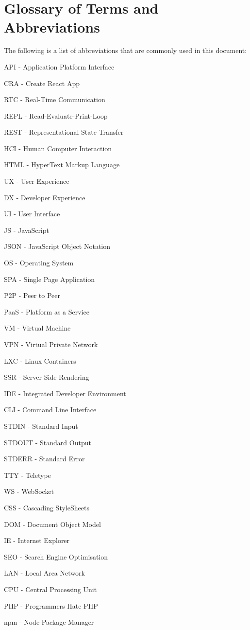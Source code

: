 \section{Glossary of Terms and Abbreviations}
The following is a list of abbreviations that are commonly used in this document:

API - Application Platform Interface

CRA - Create React App

RTC - Real-Time Communication

REPL - Read-Evaluate-Print-Loop

REST - Representational State Transfer

HCI - Human Computer Interaction

HTML - HyperText Markup Language

UX - User Experience

DX - Developer Experience

UI - User Interface

JS - JavaScript

JSON - JavaScript Object Notation

OS - Operating System

SPA - Single Page Application

P2P - Peer to Peer

PaaS - Platform as a Service

VM - Virtual Machine

VPN - Virtual Private Network

LXC - Linux Containers

SSR - Server Side Rendering

IDE - Integrated Developer Environment

CLI - Command Line Interface 

STDIN - Standard Input

STDOUT - Standard Output

STDERR - Standard Error

TTY - Teletype

WS - WebSocket

CSS - Cascading StyleSheets

DOM - Document Object Model

IE - Internet Explorer

SEO - Search Engine Optimisation

LAN - Local Area Network

CPU - Central Processing Unit

PHP - Programmers Hate PHP

npm - Node Package Manager
\pagebreak
